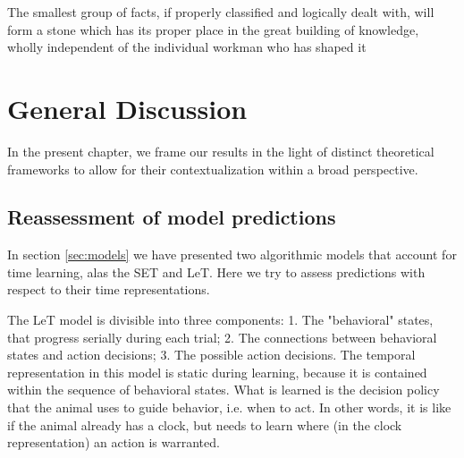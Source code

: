 

\begin{savequote}[75mm]
The smallest group of facts, if properly classified and logically dealt with, will form a stone which has its proper place in the great building of knowledge, wholly independent of the individual workman who has shaped it
\end{savequote}


\chapter{General Discussion}
\label{chap:results}

In the present chapter, we frame our results in the light of distinct theoretical frameworks to allow for their contextualization within a broad perspective.

\section{Reassessment of model predictions}
    In section \ref{sec:models} we have presented two algorithmic models that account for time learning, alas the SET and LeT. Here we try to assess predictions with respect to their time representations. 
    
    The LeT model is divisible into three components: 1. The "behavioral" states, that progress serially during each trial; 2. The connections between behavioral states and action decisions; 3. The possible action decisions. The temporal representation in this model is static during learning, because it is contained within the sequence of behavioral states. What is learned is the decision policy that the animal uses to guide behavior, i.e. when to act. In other words, it is like if the animal already has a clock, but needs to learn where (in the clock representation) an action is warranted.
    
